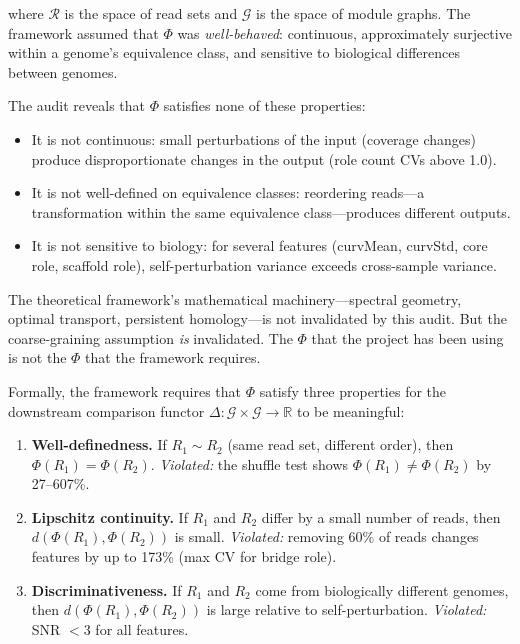 \documentclass{../yalumba}
\begin{document}
where $\mathcal{R}$ is the space of read sets and $\mathcal{G}$ is the
space of module graphs.  The framework assumed that $\Phi$ was
\emph{well-behaved}: continuous, approximately surjective within a
genome's equivalence class, and sensitive to biological differences
between genomes.

The audit reveals that $\Phi$ satisfies none of these properties:

\begin{itemize}
  \item It is not continuous: small perturbations of the input (coverage
    changes) produce disproportionate changes in the output (role count
    CVs above 1.0).
  \item It is not well-defined on equivalence classes: reordering
    reads---a transformation within the same equivalence class---produces
    different outputs.
  \item It is not sensitive to biology: for several features
    (curvMean, curvStd, core role, scaffold role), self-perturbation
    variance exceeds cross-sample variance.
\end{itemize}

The theoretical framework's mathematical machinery---spectral geometry,
optimal transport, persistent homology---is not invalidated by this
audit.  But the coarse-graining assumption \emph{is} invalidated.  The
$\Phi$ that the project has been using is not the $\Phi$ that the
framework requires.

Formally, the framework requires that $\Phi$ satisfy three properties
for the downstream comparison functor $\Delta: \mathcal{G} \times
\mathcal{G} \to \mathbb{R}$ to be meaningful:

\begin{enumerate}
  \item \textbf{Well-definedness.}  If $R_1 \sim R_2$ (same read set,
    different order), then $\Phi(R_1) = \Phi(R_2)$.  \emph{Violated:}
    the shuffle test shows $\Phi(R_1) \neq \Phi(R_2)$ by 27--607\%.
  \item \textbf{Lipschitz continuity.}  If $R_1$ and $R_2$ differ by
    a small number of reads, then $d(\Phi(R_1), \Phi(R_2))$ is small.
    \emph{Violated:} removing 60\% of reads changes features by up
    to 173\% (max CV for bridge role).
  \item \textbf{Discriminativeness.}  If $R_1$ and $R_2$ come from
    biologically different genomes, then
    $d(\Phi(R_1), \Phi(R_2))$ is large relative to
    self-perturbation.  \emph{Violated:} SNR $< 3$ for all features.
\end{enumerate}
\end{document}
